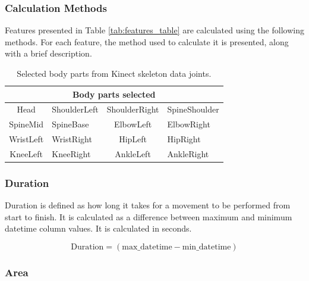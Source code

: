         \subsubsection{Calculation Methods}

            Features presented in Table \ref{tab:features_table} are calculated using the following methods. For each feature, the method used to calculate it is presented, along with a brief description.

            \begin{table}[ht]
                \centering
                \caption{Selected body parts from Kinect skeleton data joints.}
                \label{tab:body_parts_table}
                \begin{tabular}{@{}clcl@{}}
                    \toprule
                    \multicolumn{4}{c}{\textbf{Body parts selected}} \\
                    \midrule
                     Head & ShoulderLeft & ShoulderRight & SpineShoulder \\
                     SpineMid & SpineBase & ElbowLeft & ElbowRight \\
                     WristLeft & WristRight & HipLeft & HipRight \\
                     KneeLeft & KneeRight & AnkleLeft & AnkleRight \\
                    \bottomrule
                \end{tabular}
            \end{table} 

            \subsubsection{Duration}

                Duration is defined as how long it takes for a movement to be performed from start to finish. It is calculated as a difference between maximum and minimum datetime column values. It is calculated in seconds.

                \begin{equation}\label{eq:duration}
                    \text{Duration} = (\text{{max\_datetime}} - \text{{min\_datetime}})
                \end{equation}
            
            \subsubsection{Area}

